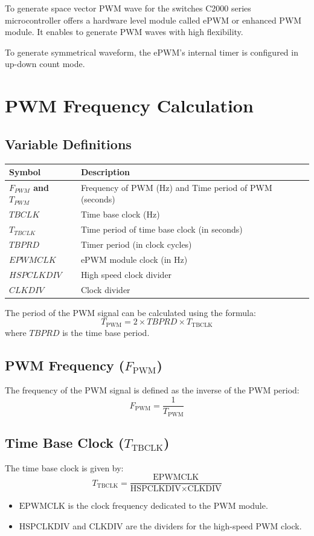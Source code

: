 To generate space vector PWM wave for the switches C2000 series microcontroller offers a hardware level module called ePWM or enhanced PWM module. It enables to generate PWM waves with high flexibility.

To generate symmetrical waveform, the ePWM's internal timer is configured in up-down count mode.

\section*{PWM Frequency Calculation}

\subsection*{Variable Definitions}

\renewcommand{\arraystretch}{1.5}
\begin{tabular}{|>{\bfseries}l|l|}
    \hline
    Symbol & Description \\ \hline
    $F_{PWM}$ and $T_{PWM}$ & Frequency of PWM (Hz) and Time period of PWM (seconds) \\ \hline
    $TBCLK$ & Time base clock (Hz)\\ \hline
    $T_{TBCLK}$ & Time period of time base clock (in seconds) \\ \hline
    $TBPRD$ & Timer period (in clock cycles) \\ \hline
    $EPWMCLK$ & ePWM module clock (in Hz)\\ \hline
    $HSPCLKDIV$ & High speed clock divider\\ \hline
    $CLKDIV$ & Clock divider \\ \hline
\end{tabular}


The period of the PWM signal can be calculated using the formula:
\[
T_{\text{PWM}} = 2 \times TBPRD \times T_{\text{TBCLK}}
\]
where \( TBPRD \) is the time base period.

\subsection{PWM Frequency (\( F_{\text{PWM}} \))}
The frequency of the PWM signal is defined as the inverse of the PWM period:
\[
F_{\text{PWM}} = \frac{1}{T_{\text{PWM}}}
\]

\subsection{Time Base Clock (\( T_{\text{TBCLK}} \))}
The time base clock is given by:
\[
T_{\text{TBCLK}} = \frac{\text{EPWMCLK}}{\text{HSPCLKDIV} \times \text{CLKDIV}}
\]
\begin{itemize}
    \item \( \text{EPWMCLK} \) is the clock frequency dedicated to the PWM module.
    \item \( \text{HSPCLKDIV} \) and \( \text{CLKDIV} \) are the dividers for the high-speed PWM clock.
\end{itemize}

